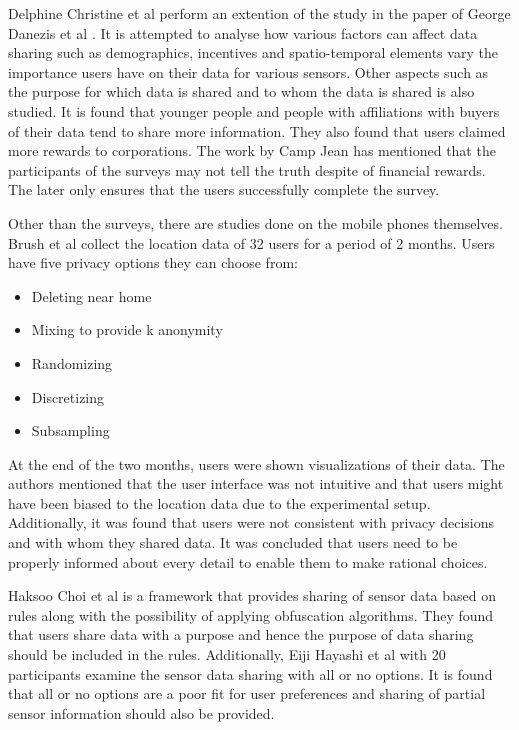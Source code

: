 Delphine Christine et al \cite{christin2013s} perform an extention of the study in the paper of George Danezis et al \cite{danezis2005much}. It is attempted to analyse how various factors can affect data sharing such as demographics, incentives and spatio-temporal elements vary the importance users have on their data for various sensors. Other aspects such as the purpose for which data is shared and to whom the data is shared is also studied. It is found that younger people and people with affiliations with buyers of their data tend to share more information. They also found that users claimed more rewards to corporations. The work by Camp Jean \cite{camp2005state} has mentioned that the participants of the surveys may not tell the truth despite of financial rewards. The later only ensures that the users successfully complete the survey.

Other than the surveys, there are studies done on the mobile phones themselves. Brush et al \cite{brush2010exploring} collect the location data of 32 users for a period of 2 months. Users have five privacy options they can choose from:

\begin{itemize}
\item Deleting near home
\item Mixing to provide k anonymity
\item Randomizing
\item Discretizing
\item Subsampling
\end{itemize}

At the end of the two months, users were shown visualizations of their data. The authors mentioned that the user interface was not intuitive and that users might have been biased to the location data due to the experimental setup. Additionally, it was found that users were not consistent with privacy decisions and with whom they shared data. It was concluded that users need to be properly informed about every detail to enable them to make rational choices.

Haksoo Choi et al \cite{choi2011sensorsafe} is a framework that provides sharing of sensor data based on rules along with the possibility of applying obfuscation algorithms. They found that users share data with a purpose and hence the purpose of data sharing should be included in the rules. Additionally, Eiji Hayashi et al \cite{hayashi2012goldilocks} with 20 participants examine the sensor data sharing with all or no options. It is found that all or no options are a poor fit for user preferences and sharing of partial sensor information should also be provided.

